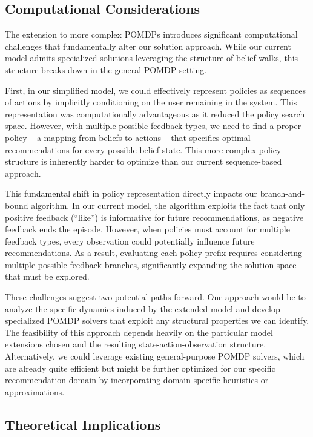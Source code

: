 \subsection{Computational Considerations}

The extension to more complex POMDPs introduces significant computational challenges that fundamentally alter our solution approach. While our current model admits specialized solutions leveraging the structure of belief walks, this structure breaks down in the general POMDP setting. 

First, in our simplified model, we could effectively represent policies as sequences of actions by implicitly conditioning on the user remaining in the system. This representation was computationally advantageous as it reduced the policy search space. However, with multiple possible feedback types, we need to find a proper policy -- a mapping from beliefs to actions -- that specifies optimal recommendations for every possible belief state. This more complex policy structure is inherently harder to optimize than our current sequence-based approach.

This fundamental shift in policy representation directly impacts our branch-and-bound algorithm. In our current model, the algorithm exploits the fact that only positive feedback (``like'') is informative for future recommendations, as negative feedback ends the episode. However, when policies must account for multiple feedback types, every observation could potentially influence future recommendations. As a result, evaluating each policy prefix requires considering multiple possible feedback branches, significantly expanding the solution space that must be explored.

These challenges suggest two potential paths forward. One approach would be to analyze the specific dynamics induced by the extended model and develop specialized POMDP solvers that exploit any structural properties we can identify. The feasibility of this approach depends heavily on the particular model extensions chosen and the resulting state-action-observation structure. Alternatively, we could leverage existing general-purpose POMDP solvers, which are already quite efficient but might be further optimized for our specific recommendation domain by incorporating domain-specific heuristics or approximations.

\subsection{Theoretical Implications}

